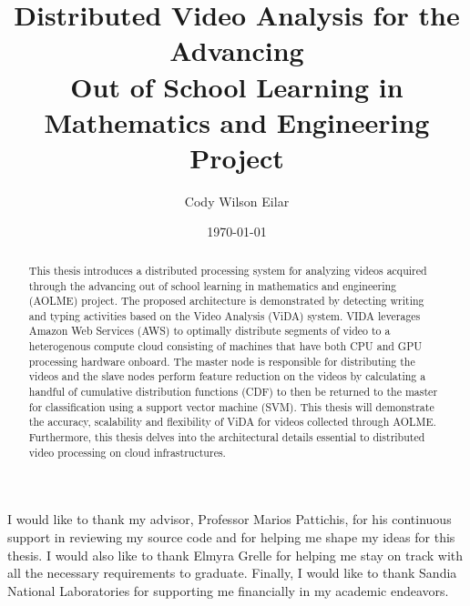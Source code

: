 \documentclass[botnum, fleqn, final]{unmeethesis}
\begin{document}
  \frontmatter



  \title{Distributed Video Analysis for the  Advancing  \\
  Out of School Learning in Mathematics and Engineering Project}

  \author{Cody Wilson Eilar}
  \date{\monthyeardate\today}

  \maketitle



  \begin{acknowledgments}
    \vspace{1.1in}
    I would like to thank my advisor, Professor Marios Pattichis, for his
    continuous support in reviewing my source code and for helping me shape my
    ideas for this thesis. I would also like to thank Elmyra Grelle for helping
    me stay on track with all the necessary requirements to graduate. Finally, I
    would like to thank Sandia National Laboratories for supporting me
    financially in my academic endeavors.
  \end{acknowledgments}

  \maketitleabstract %

  \begin{abstract}
    This thesis introduces a distributed processing system for analyzing videos
    acquired through the advancing out of school learning in mathematics and
    engineering \\ (AOLME)
     project. The proposed architecture is demonstrated by
    detecting writing and typing activities based on the Video Analysis (ViDA)
    system. VIDA leverages Amazon Web Services (AWS) to optimally distribute
    segments of video to a heterogenous compute cloud consisting of machines
    that have both CPU and GPU processing hardware onboard. The master node is
    responsible for distributing the videos and the slave nodes perform feature
    reduction on the videos by calculating a handful of cumulative distribution
    functions (CDF) to then be returned to the master for classification using a
    support vector machine (SVM). This thesis will demonstrate the accuracy,
    scalability and flexibility of ViDA for videos collected through AOLME.
    Furthermore, this thesis delves into the architectural details essential to
    distributed video processing on cloud infrastructures.

    \clearpage %
  \end{abstract}
\end{document}
